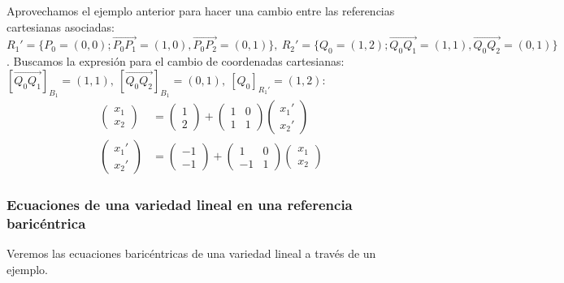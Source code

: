 \documentclass[14pt]{book}
\begin{document}
\begin{ej}
	Aprovechamos el ejemplo anterior para hacer una cambio entre las referencias cartesianas asociadas: $R_1' = \{P_0 = (0, 0); \overrightarrow{P_0 P_1} = (1, 0), \overrightarrow{P_0 P_2} = (0,1)\},\ R_2' = \{Q_0 = (1, 2); \overrightarrow{Q_0 Q_1} = (1, 1), \overrightarrow{Q_0 Q_2} = (0,1)\}$. Buscamos la expresión para el cambio de coordenadas cartesianas: $[\overrightarrow{Q_0 Q_1}]_{B_1} = (1, 1),\ [\overrightarrow{Q_0 Q_2}]_{B_1} = (0, 1),\ [Q_0]_{R_1'} = (1, 2)$:
	\begin{align*}
		\left(
		\begin{array}{c}
		x_1 \\ x_2
		\end{array}
		\right) &= 
		\left(
		\begin{array}{c}
		1 \\ 2
		\end{array}
		\right) + 
		\left(
		\begin{array}{cc}
		1 & 0 \\ 1 & 1
		\end{array}
		\right)
		\left(
		\begin{array}{c}
		x_1'\\ x_2'
		\end{array}
		\right) \\
		\left(
		\begin{array}{c}
		x_1' \\ x_2'
		\end{array}
		\right) &= 
		\left(
		\begin{array}{c}
		-1 \\ -1
		\end{array}
		\right) + 
		\left(
		\begin{array}{cc}
		1 & 0 \\ -1 & 1
		\end{array}
		\right)
		\left(
		\begin{array}{c}
		x_1 \\ x_2
		\end{array}
		\right)
	\end{align*}
\end{ej}

\subsubsection{Ecuaciones de una variedad lineal en una referencia baricéntrica}

Veremos las ecuaciones baricéntricas de una variedad lineal a través de un ejemplo.
\end{document}
